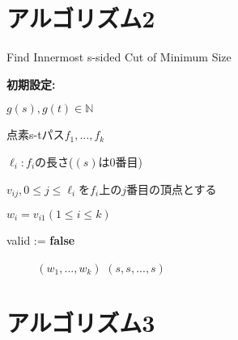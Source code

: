 \documentclass{jarticle}
\begin{document}
\section*{アルゴリズム2}

\begin{algorithm}[H]
    \caption{Find Innermost s-sided Cut of Minimum Size} 
    \textbf{初期設定:} \par
    $g(s),g(t)\in \mathbb{N}$ \par
    点素s-tパス$f_1,...,f_k$ \par
    $\ell_i:f_i$の長さ($(s)$は0番目) \par
    $v_{ij},0 \leq j \leq \ell_i$を$f_i$上の$j$番目の頂点とする \par
    $w_i=v_{i1}(1\leq i \leq k)$ \par
    valid := \textbf{false} \par 
    {\setlength{\baselineskip}{10pt}
    \begin{algorithmic}[1]
         
         
             
             
            \Else
            \EndIf　
        \EndWhile　
      \EndFor
       $(w_1,...,w_k)$
      \Else
       $(s,s,...,s)$
      \EndIf
    \end{algorithmic}
    }
\end{algorithm}

\section*{アルゴリズム3}
\end{document}
